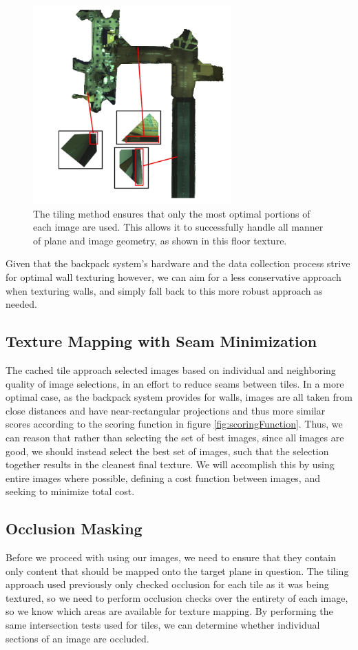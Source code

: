 \documentclass[10pt,twocolumn,letterpaper]{article}
\begin{document}
\begin{figure}
  \centering
  \includegraphics[width=3in]{floor_suboptimal.jpg}
  \caption{The tiling method ensures that only the most optimal
    portions of each image are used. This allows it to successfully
    handle all manner of plane and image geometry, as shown in this
    floor texture.}
  \label{fig:floor_suboptimal}
\end{figure}

Given that the backpack system's hardware and the data collection
process strive for optimal wall texturing however, we can aim for a
less conservative approach when texturing walls, and simply fall back
to this more robust approach as needed.

\subsection{Texture Mapping with Seam Minimization}
The cached tile approach selected images based on individual and
neighboring quality of image selections, in an effort to reduce seams
between tiles. In a more optimal case, as the backpack system provides
for walls, images are all taken from close distances and have
near-rectangular projections and thus more similar scores according to the
scoring function in figure \ref{fig:scoringFunction}. Thus, we can
reason that rather than selecting the set of best images, since all
images are good, we should instead select the best set of images, such
that the selection together results in the cleanest final texture. We
will accomplish this by using entire images where possible, defining a
cost function between images, and seeking to minimize total cost.

\subsection{Occlusion Masking}
Before we proceed with using our images, we need to ensure that they
contain only content that should be mapped onto the target plane in
question. The tiling approach used previously only checked occlusion
for each tile as it was being textured, so we need to perform
occlusion checks over the entirety of each image, so we know which
areas are available for texture mapping. By performing the same
intersection tests used for tiles, we can determine whether individual
sections of an image are occluded.
\end{document}
